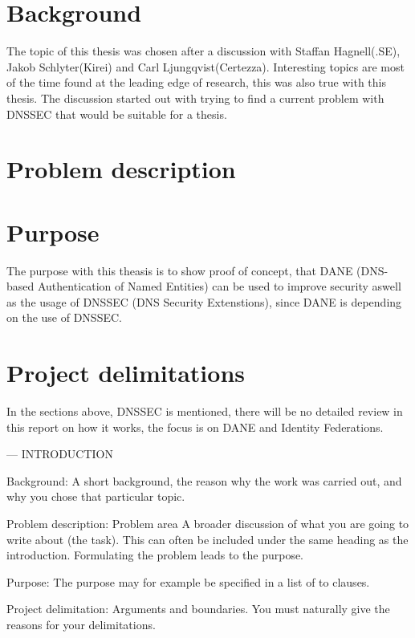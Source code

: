 \section{Background}
The topic of this thesis was chosen after a discussion with Staffan Hagnell(.SE), Jakob Schlyter(Kirei) and Carl Ljungqvist(Certezza).
Interesting topics are most of the time found at the leading edge of research, this was also true with this thesis. The discussion started out with trying to find a current problem with DNSSEC that would be suitable for a thesis.

\section{Problem description}

\section{Purpose}
The purpose with this theasis is to show proof of concept, that DANE (DNS-based Authentication of Named Entities) can be used to improve security aswell as the usage of DNSSEC (DNS Security Extenstions), since DANE is depending on the use of DNSSEC.

\section{Project delimitations}
In the sections above, DNSSEC is mentioned, there will be no detailed review in this report on how it works, the focus is on DANE and Identity Federations. 

---
INTRODUCTION 

Background: A short background, the reason why the work was carried out, and why you chose that particular topic.

Problem description: Problem area A broader discussion of what you are going to write about (the task). This can often be included under the same heading as the introduction. Formulating the problem leads to the purpose.

Purpose: The purpose may for example be specified in a list of to clauses.

Project delimitation: Arguments and boundaries. You must naturally give the reasons for your delimitations.
